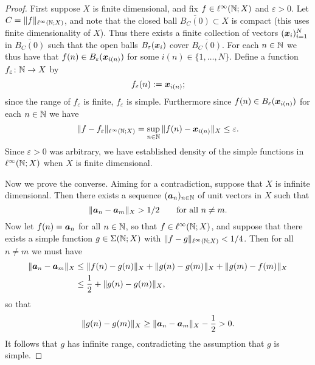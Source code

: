 \begin{proof}
  First suppose $X$ is finite dimensional, and fix $f \in \ell^\infty(\mathbb{N};X)$ and $\varepsilon > 0$.
  Let $C = \|f\|_{\ell^\infty(\mathbb{N};X)}$, and note that the closed ball $\overline{B_C(0)} \subset X$ is compact (this uses finite dimensionality of $X$).
  Thus there exists a finite collection of vectors $(\bm{x}_i)_{i=1}^N$ in $\overline{B_C(0)}$ such that the open balls $B_{\varepsilon}(\bm{x}_i)$ cover $\overline{B_C(0)}$.
  For each $n \in \mathbb{N}$ we thus have that $f(n) \in B_{\varepsilon}(\bm{x}_{i(n)})$ for some $i(n) \in \{1,\ldots,N\}$.
  Define a function $f_{\varepsilon} \colon \mathbb{N} \rightarrow X$ by
  \begin{equation*}
    f_{\varepsilon}(n) := \bm{x}_{i(n)};
  \end{equation*}
  since the range of $f_{\varepsilon}$ is finite, $f_{\varepsilon}$ is simple.
  Furthermore since $f(n) \in B_{\varepsilon}(\bm{x}_{i(n)})$ for each $n \in \mathbb{N}$ we have
  \begin{equation*}
    \|f - f_{\varepsilon}\|_{\ell^\infty(\mathbb{N};X)} = \sup_{n \in \mathbb{N}} \|f(n) - \bm{x}_{i(n)}\|_{X} \leq \varepsilon.
  \end{equation*}
  Since $\varepsilon > 0$ was arbitrary, we have established density of the simple functions in $\ell^\infty(\mathbb{N};X)$ when $X$ is finite dimensional.

  Now we prove the converse.
  Aiming for a contradiction, suppose that $X$ is infinite dimensional.
  Then there exists a sequence $(\bm{a}_n)_{n \in \mathbb{N}}$ of unit vectors in $X$ such that
  \begin{equation*}
    \|\bm{a}_n - \bm{a}_m\|_X > 1/2 \qquad \text{for all $n \neq m$.}
  \end{equation*}
  Now let $f(n) = \bm{a}_n$ for all $n \in \mathbb{N}$, so that $f \in \ell^\infty(\mathbb{N};X)$, and suppose that there exists a simple function $g \in \Sigma(\mathbb{N};X)$ with $\|f - g\|_{\ell^\infty(\mathbb{N};X)} < 1/4$.
  Then for all $n \neq m$ we must have
  \begin{equation*}
    \begin{aligned}
      \|\bm{a}_n - \bm{a}_m\|_X &\leq \|f(n) - g(n)\|_X + \|g(n) - g(m)\|_X + \|g(m) - f(m)\|_X \\
      &\leq \frac{1}{2} + \|g(n) - g(m)\|_X,
    \end{aligned}
  \end{equation*}
  so that
  \begin{equation*}
    \|g(n) - g(m)\|_X \geq \|\bm{a}_n - \bm{a}_m\|_X - \frac{1}{2} > 0.
  \end{equation*}
  It follows that $g$ has infinite range, contradicting the assumption that $g$ is simple.
\end{proof}

